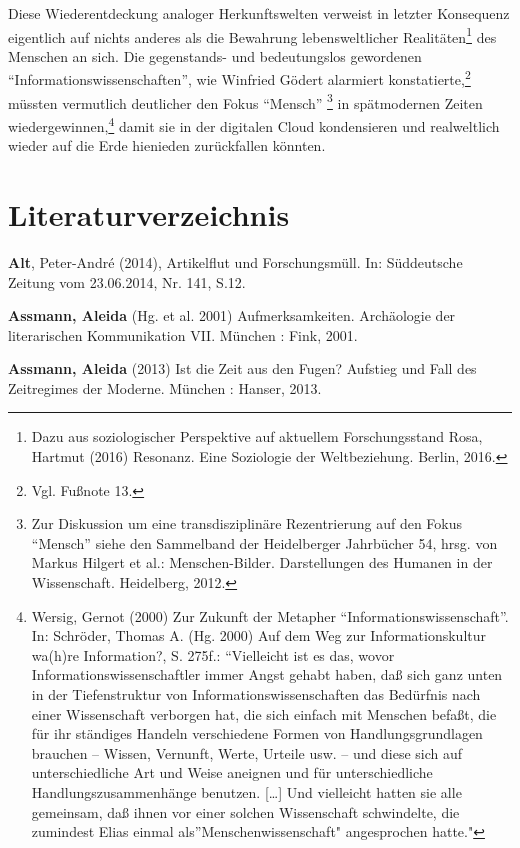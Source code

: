 \documentclass[a4paper,
fontsize=11pt,
oneside,
numbers=noperiodatend,
parskip=half-,
bibliography=totoc,
final
]{scrartcl}
\begin{document}
Diese Wiederentdeckung analoger Herkunftswelten verweist in letzter
Konsequenz eigentlich auf nichts anderes als die Bewahrung
lebensweltlicher Realitäten\footnote{Dazu aus soziologischer Perspektive
  auf aktuellem Forschungsstand Rosa, Hartmut (2016) Resonanz. Eine
  Soziologie der Weltbeziehung. Berlin, 2016.} des Menschen an sich. Die
gegenstands- und bedeutungslos gewordenen
\enquote{Informationswissenschaften}, wie Winfried Gödert alarmiert
konstatierte,\footnote{Vgl. Fußnote 13.} müssten vermutlich deutlicher
den Fokus \enquote{Mensch} \footnote{Zur Diskussion um eine
  transdisziplinäre Rezentrierung auf den Fokus \enquote{Mensch} siehe
  den Sammelband der Heidelberger Jahrbücher 54, hrsg. von Markus
  Hilgert et al.: Menschen-Bilder. Darstellungen des Humanen in der
  Wissenschaft. Heidelberg, 2012.} in spätmodernen Zeiten
wiedergewinnen,\footnote{Wersig, Gernot (2000) Zur Zukunft der Metapher
  \enquote{Informationswissenschaft}. In: Schröder, Thomas A. (Hg. 2000)
  Auf dem Weg zur Informationskultur wa(h)re Information?, S. 275f.:
  \enquote{Vielleicht ist es das, wovor Informationswissenschaftler
  immer Angst gehabt haben, daß sich ganz unten in der Tiefenstruktur
  von Informationswissenschaften das Bedürfnis nach einer Wissenschaft
  verborgen hat, die sich einfach mit Menschen befaßt, die für ihr
  ständiges Handeln verschiedene Formen von Handlungsgrundlagen brauchen
  -- Wissen, Vernunft, Werte, Urteile usw. -- und diese sich auf
  unterschiedliche Art und Weise aneignen und für unterschiedliche
  Handlungszusammenhänge benutzen. {[}\ldots{}{]} Und vielleicht hatten
  sie alle gemeinsam, daß ihnen vor einer solchen Wissenschaft
  schwindelte, die zumindest Elias einmal als}Menschenwissenschaft"
  angesprochen hatte."} damit sie in der digitalen Cloud kondensieren
und realweltlich wieder auf die Erde hienieden zurückfallen könnten.

\section*{Literaturverzeichnis}\label{literaturverzeichnis}

\textbf{Alt}, Peter-André (2014), Artikelflut und Forschungsmüll. In:
Süddeutsche Zeitung vom 23.06.2014, Nr. 141, S.12.

\textbf{Assmann, Aleida} (Hg. et al. 2001) Aufmerksamkeiten. Archäologie
der literarischen Kommunikation VII. München : Fink, 2001.

\textbf{Assmann, Aleida} (2013) Ist die Zeit aus den Fugen? Aufstieg und
Fall des Zeitregimes der Moderne. München : Hanser, 2013.
\end{document}
